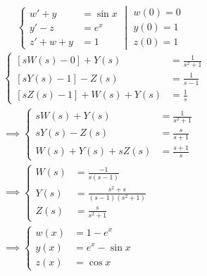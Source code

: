 \documentclass[11pt,a4paper,titlepage,final]{article}
\begin{document}
\begin{exercise*}{12.14}\[
	\left.
	\begin{cases}
		w'+y &= \sin x \\
		y'-z &= e^x \\
		z'+w+y &= 1
	\end{cases}
	\middle|
	\begin{array}{l}
	w(0)=0\\y(0)=1\\z(0)=1
	\end{array}
	\right.
	\]
	\tcblower
	\begin{align*}
	&\begin{cases}
		\left[sW(s)-0\right]+Y(s) &= \frac{1}{s^2+1} \\
		\left[sY(s)-1\right]-Z(s) &= \frac{1}{s-1} \\
		\left[sZ(s)-1\right]+W(s)+Y(s) &= \frac{1}{s}
	\end{cases}
	\\ &\implies
	\begin{cases}
	sW(s)+Y(s)&= \frac{1}{s^2+1} \\
	sY(s)-Z(s) &= \frac{s}{s+1} \\
	W(s)+Y(s)+sZ(s) &= \frac{s+1}{s}
	\end{cases} \\ &\implies \begin{cases}
	W(s) &= \frac{-1}{s(s-1)} \\
	Y(s) &= \frac{s^2+s}{(s-1)(s^2+1)} \\
	Z(s) &= \frac{s}{s^2+1}
	\end{cases}
	\\ &\implies
	\begin{cases}
	w(x) &= 1-e^x \\
	y(x) &= e^x-\sin x\\
	z(x) &= \cos x
	\end{cases}
	\end{align*}
\end{exercise*}
\end{document}
